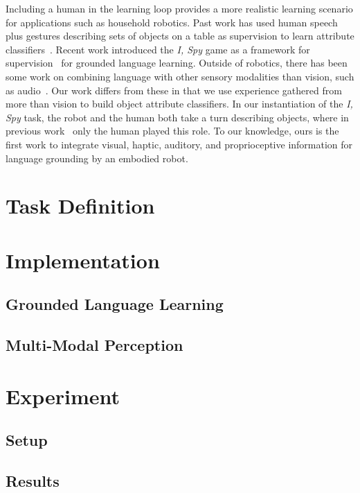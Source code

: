 \documentclass{article}
\newcommand{\ispy}{\textit{I, Spy} }
\begin{document}
	Including a human in the learning loop provides a more realistic learning scenario for applications such as household robotics. Past work has used human speech plus gestures describing sets of objects on a table as supervision to learn attribute classifiers~\cite{matuszek:aaai14,kollar:rss13}. Recent work introduced the \ispy game as a framework for supervision~\cite{parde:ijcai15} for grounded language learning. Outside of robotics, there has been some work on combining language with other sensory modalities than vision, such as audio~\cite{kiela:emnlp15}. Our work differs from these in that we use experience gathered from more than vision to build object attribute classifiers. In our instantiation of the \ispy task, the robot and the human both take a turn describing objects, where in previous work~ only the human played this role. To our knowledge, ours is the first work to integrate visual, haptic, auditory, and proprioceptive information for language grounding by an embodied robot.


\section{Task Definition}

\section{Implementation}

	\subsection{Grounded Language Learning}

	\subsection{Multi-Modal Perception}

\section{Experiment}

	\subsection{Setup}

	\subsection{Results}


\newpage


\end{document}
